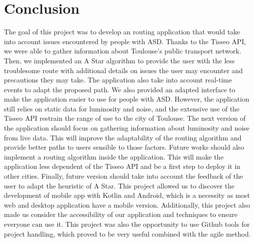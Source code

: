 \section{Conclusion}

The goal of this project was to develop an routing application that would take into account issues encountered by people with ASD. Thanks to the Tisseo API, we were able to gather information about Toulouse's public transport network. Then, we implemented an A Star algorithm to provide the user with the less troublesome route with additional details on issues the user may encounter and precautions they may take. The application also take into account real-time events to adapt the proposed path. We also provided an adapted interface to make the application easier to use for people with ASD.
\newline
However, the application still relies on static data for luminosity and noise, and the extensive use of the Tisseo API restrain the range of use to the city of Toulouse. The next version of the application should focus on gathering information about luminosity and noise from live data. This will improve the adaptability of the routing algorithm and provide better paths to users sensible to those factors. Future works should also implement a routing algorithm inside the application. This will make the application less dependent of the Tisseo API and be a first step to deploy it in other cities. Finally, future version should take into account the feedback of the user to adapt the heuristic of A Star.
\newline
This project allowed us to discover the development of mobile app with Kotlin and Android, which is a necessity as most web and desktop application have a mobile version. Additionally, this project also made us consider the accessibility of our application and techniques to ensure everyone can use it. This project was also the opportunity to use Github tools for project handling, which proved to be very useful combined with the agile method.
\newline

